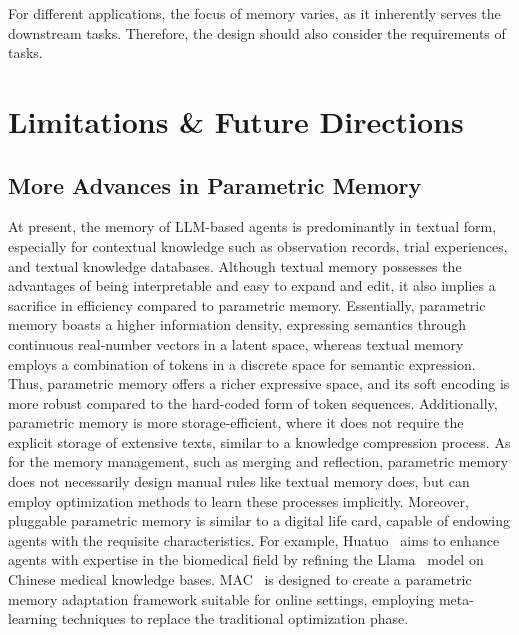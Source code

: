 \documentclass{article}
\theoremstyle{definition}
\theoremstyle{theorem}
\theoremstyle{proof}
\theoremstyle{remark}
\begin{document}
	For different applications, the focus of memory varies, as it inherently serves the downstream tasks. Therefore, the design should also consider the requirements of tasks.
	
	
	\section{Limitations \& Future Directions}
	\label{sec:future}
	
	\subsection{More Advances in Parametric Memory}
	
	At present, the memory of LLM-based agents is predominantly in textual form, especially for contextual knowledge such as observation records, trial experiences, and textual knowledge databases. Although textual memory possesses the advantages of being interpretable and easy to expand and edit, it also implies a sacrifice in efficiency compared to parametric memory. Essentially, parametric memory boasts a higher information density, expressing semantics through continuous real-number vectors in a latent space, whereas textual memory employs a combination of tokens in a discrete space for semantic expression. Thus, parametric memory offers a richer expressive space, and its soft encoding is more robust compared to the hard-coded form of token sequences.
	Additionally, parametric memory is more storage-efficient, where it does not require the explicit storage of extensive texts, similar to a knowledge compression process. As for the memory management, such as merging and reflection, parametric memory does not necessarily design manual rules like textual memory does, but can employ optimization methods to learn these processes implicitly. Moreover, pluggable parametric memory is similar to a digital life card, capable of endowing agents with the requisite characteristics.
	For example, Huatuo~\cite{huatuo} aims to enhance agents with expertise in the biomedical field by refining the Llama~\cite{llama} model on Chinese medical knowledge bases. MAC~\cite{mac} is designed to create a parametric memory adaptation framework suitable for online settings, employing meta-learning techniques to replace the traditional optimization phase.
	
\end{document}
